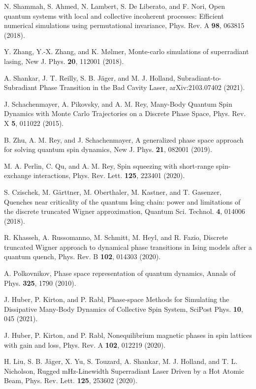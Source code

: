\documentclass[pra,twocolumn,showpacs,preprintnumbers,amsmath,amssymb,superscriptaddress]{revtex4-1}
\begin{document}
\begin{thebibliography}{99}
 N. Shammah, S. Ahmed, N. Lambert, S. De Liberato, and F. Nori, Open quantum systems with local and collective incoherent processes:
Efficient numerical simulations using permutational invariance, Phys. Rev. A {\bf 98}, 063815 (2018).

 Y. Zhang, Y.-X. Zhang, and K. M\o lmer, Monte-carlo simulations of superradiant lasing, New J. Phys. {\bf 20}, 112001 (2018).

 A. Shankar, J. T. Reilly, S. B. J\"ager, and M. J. Holland, Subradiant-to-Subradiant Phase Transition in the Bad Cavity Laser,  arXiv:2103.07402 (2021). 


 J. Schachenmayer, A. Pikovsky, and A. M. Rey, Many-Body Quantum Spin Dynamics with Monte Carlo Trajectories on a Discrete Phase Space, Phys. Rev. X {\bf 5}, 011022 (2015).

 B. Zhu, A. M. Rey, and J. Schachenmayer, A generalized phase space approach for solving quantum spin dynamics, New J. Phys. {\bf 21}, 082001 (2019).

 M. A. Perlin, C. Qu, and A. M. Rey, Spin squeezing with short-range spin-exchange interactions, Phys. Rev. Lett. {\bf 125}, 223401 (2020).	
	
 S. Czischek, M. G\"arttner, M. Oberthaler, M. Kastner, and T. Gasenzer, Quenches near criticality of the quantum Ising chain: power and limitations of the discrete truncated Wigner approximation, Quantum Sci. Technol. {\bf 4}, 014006 (2018).

 R. Khasseh, A. Russomanno, M. Schmitt, M. Heyl, and R. Fazio, Discrete truncated Wigner approach to dynamical phase transitions in Ising models after a quantum quench, Phys. Rev. B {\bf 102}, 014303 (2020).

 A. Polkovnikov, Phase space representation of quantum dynamics, Annals of Phys. {\bf 325}, 1790 (2010).

 J. Huber, P. Kirton, and P. Rabl, Phase-space Methods for Simulating the Dissipative Many-Body Dynamics of Collective Spin System, SciPost Phys. {\bf 10}, 045 (2021).

 J. Huber, P. Kirton, and P. Rabl, Nonequilibrium magnetic phases in spin lattices with gain and loss, Phys. Rev. A {\bf 102}, 012219 (2020).

 H. Liu, S. B. J\"ager, X. Yu, S. Touzard, A. Shankar, M. J. Holland, and T. L. Nicholson, Rugged mHz-Linewidth
Superradiant Laser Driven by a Hot Atomic Beam, Phys. Rev. Lett. {\bf 125}, 253602 (2020).


\end{thebibliography}
\end{document}
